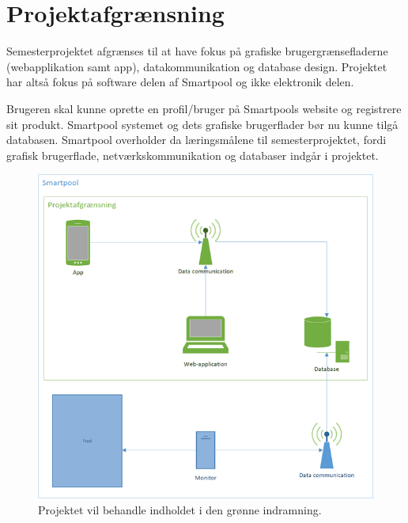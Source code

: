 \section{Projektafgrænsning}
Semesterprojektet afgrænses til at have fokus på grafiske brugergrænsefladerne (webapplikation samt app), datakommunikation og database design. Projektet har altså fokus på software delen af Smartpool og ikke elektronik delen.

Brugeren skal kunne oprette en profil/bruger på Smartpools website og registrere sit produkt. Smartpool systemet og dets grafiske brugerflader bør nu kunne tilgå databasen. Smartpool overholder da læringsmålene til semesterprojektet, fordi grafisk brugerflade, netværkskommunikation og databaser indgår i projektet.

\begin{figure}
\centering
\includegraphics[width=0.99\linewidth]{figs/afgraensning.png}
\caption{Projektet vil behandle indholdet i den grønne indramning.}
\label{fig:afgraensning}
\end{figure}

\newpage
